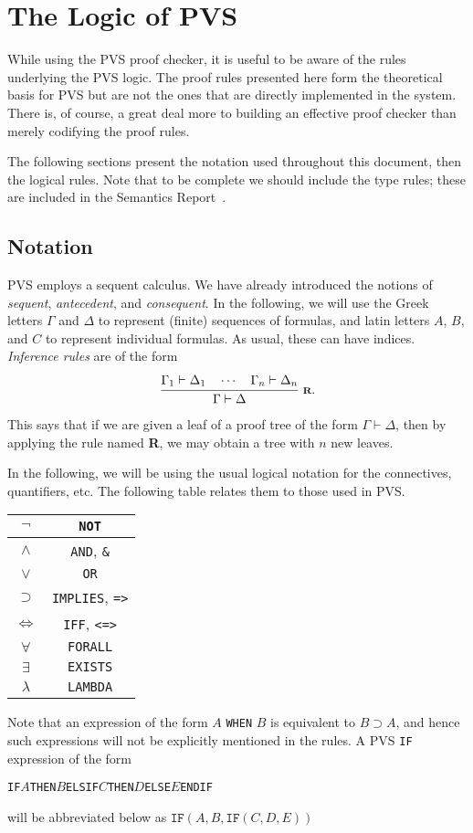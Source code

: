 \documentclass[12pt,twoside]{book}
\begin{document}
\chapter{The Logic of PVS} 
\label{logic}


While using the PVS proof checker, it is useful to be aware of the
rules underlying the PVS logic.  The proof rules presented here
form the theoretical basis for PVS but are not the ones that
are directly implemented in the system.   There is, of course,
a great deal more to building an effective proof checker than merely
codifying the proof rules.

The following sections present the notation used throughout this
document, then the logical rules.  Note that to be complete we should
include the type rules; these are included in the Semantics
Report~\cite{PVS:semantics}.

\section{Notation}

PVS employs a sequent calculus.  We have already introduced the
notions of \emph{sequent}, \emph{antecedent}, and \emph{consequent}.
In the following, we will use the Greek letters $\Gamma$ and $\Delta$ to
represent (finite) sequences of formulas, and latin letters $A$, $B$, and
$C$ to represent individual formulas.  As usual, these can have indices.
\emph{Inference rules} are of the form
$${{\displaystyle\strut \Gamma_1\vdash\Delta_1\quad\cdots\quad\Gamma_n\vdash\Delta_n}\over{\displaystyle\strut \Gamma\vdash\Delta}}\;\mbox{\scriptsize$\bf R$}.$$ This says that if we are given a leaf of a
proof tree of the form $\Gamma\vdash\Delta$, then by applying the rule
named {\bf R}, we may obtain a tree with $n$ new leaves.

In the following, we will be using the usual logical notation for the
connectives, quantifiers, etc.  The following table relates them to
those used in PVS.\@

\begin{center}
\begin{tabular}{|c|c|}\hline
$\neg$ & \texttt{NOT}\\\hline
$\wedge$ & \texttt{AND}, \texttt{\&}\\\hline
$\vee$ & \texttt{OR}\\\hline
$\supset$ & \texttt{IMPLIES}, \texttt{=>}\\\hline
$\iff$ & \texttt{IFF}, \texttt{<=>}\\\hline
$\forall$ & \texttt{FORALL}\\\hline
$\exists$ & \texttt{EXISTS}\\\hline
$\lambda$ & \texttt{LAMBDA}\\\hline
\end{tabular}
\end{center}
Note that an expression of the form $A$ \texttt{WHEN} $B$ is equivalent to
$B\supset A$, and hence such expressions will not be explicitly
mentioned in the rules.  A PVS \texttt{IF} expression of the form
\begin{alltt}
  IF \(A\) THEN \(B\) ELSIF \(C\) THEN \(D\) ELSE \(E\) ENDIF
\end{alltt}
will be abbreviated  below as $\texttt{IF}(A,B,\texttt{IF}(C,D,E))$
\end{document}
